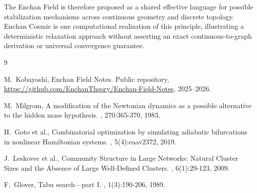 \documentclass[11pt,a4paper]{article}
\begin{document}
The Enchan Field is therefore proposed as a shared effective language for possible stabilization mechanisms across continuous geometry and discrete topology. Enchan Cosmic is one computational realization of this principle, illustrating a deterministic relaxation approach without asserting an exact continuous-to-graph derivation or universal convergence guarantee.

\clearpage


\begin{thebibliography}{9}

M.~Kobayashi,
\newblock Enchan Field Notes.
\newblock Public repository, \url{https://github.com/EnchanTheory/Enchan-Field-Notes}, 2025--2026.

M.~Milgrom,
\newblock A modification of the Newtonian dynamics as a possible alternative to the hidden mass hypothesis.
, 270:365-370, 1983.

H.~Goto et al.,
\newblock Combinatorial optimization by simulating adiabatic bifurcations in nonlinear Hamiltonian systems.
, 5(4):eaav2372, 2019.

J.~Leskovec et al.,
\newblock Community Structure in Large Networks: Natural Cluster Sizes and the Absence of Large Well-Defined Clusters.
, 6(1):29-123, 2009.

F.~Glover,
\newblock Tabu search---part I.
, 1(3):190-206, 1989.

\end{thebibliography}
\end{document}
